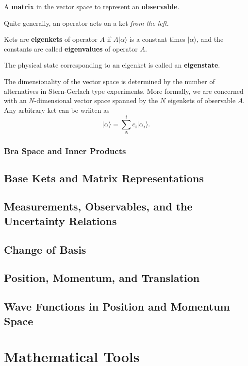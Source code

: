 \documentclass[11pt]{elegantbook}
\begin{document}
\begin{definition}[operator]
  A \textbf{matrix} in the vector space to represent an \textbf{observable}.
\end{definition}
Quite generally, an operator acts on a ket \textit{from the left}.

\begin{definition}
  Kets are \textbf{eigenkets} of operator $A$ if $A\vert\alpha\rangle$ is a constant times $\vert\alpha\rangle$, and 
  the constants are called \textbf{eigenvalues} of operator $A$.

  The physical state corresponding to an eigenket is called an \textbf{eigenstate}.
\end{definition}

The dimensionality of the vector space is determined by the number of alternatives in 
Stern-Gerlach type experiments. More formally, we are concerned with an $N$-dimensional 
vector space spanned by the $N$ eigenkets of observable $A$. Any arbitrary ket can be 
wriiten as 
\begin{equation}
  \vert\alpha\rangle=\sum_N^ic_i\vert\alpha_i\rangle.
\end{equation}

\subsection{Bra Space and Inner Products}



\newpage

\section{Base Kets and Matrix Representations}

\newpage

\section{Measurements, Observables, and the Uncertainty Relations}

\newpage

\section{Change of Basis}

\newpage

\section{Position, Momentum, and Translation}

\newpage

\section{Wave Functions in Position and Momentum Space}

\newpage


\nocite{sakurai2020modern}
\printbibliography[heading=bibintoc, title=\ebibname]

\appendix

\chapter{Mathematical Tools}
\end{document}
